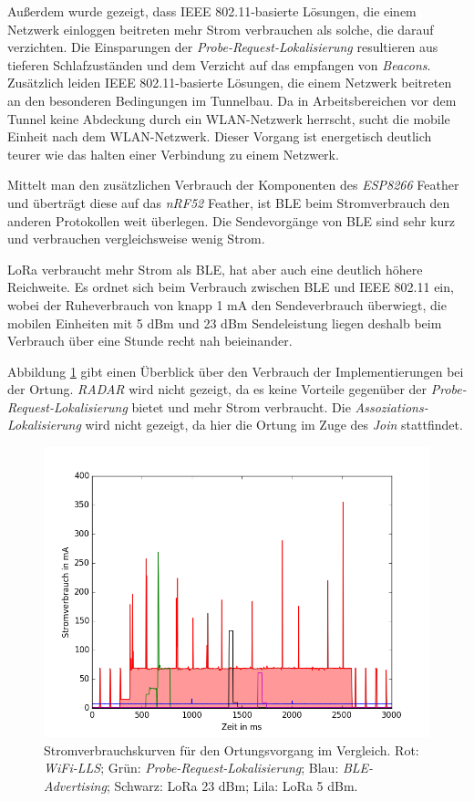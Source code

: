 Außerdem wurde gezeigt, dass IEEE 802.11-basierte Lösungen, die einem Netzwerk einloggen beitreten mehr Strom verbrauchen als solche, die darauf verzichten.
Die Einsparungen der \emph{Probe-Request-Lokalisierung} resultieren aus tieferen Schlafzuständen und dem Verzicht auf das empfangen von \emph{Beacons}.
Zusätzlich leiden IEEE 802.11-basierte Lösungen, die einem Netzwerk beitreten an den besonderen Bedingungen im Tunnelbau.
Da in Arbeitsbereichen vor dem Tunnel keine Abdeckung durch ein WLAN-Netzwerk herrscht, sucht die mobile Einheit nach dem WLAN-Netzwerk.
Dieser Vorgang ist energetisch deutlich teurer wie das halten einer Verbindung zu einem Netzwerk.

Mittelt man den zusätzlichen Verbrauch der Komponenten des \emph{ESP8266} Feather und überträgt diese auf das \emph{nRF52} Feather, ist BLE beim Stromverbrauch den anderen Protokollen weit überlegen.
Die Sendevorgänge von BLE sind sehr kurz und verbrauchen vergleichsweise wenig Strom.

LoRa verbraucht mehr Strom als BLE, hat aber auch eine deutlich höhere Reichweite.
Es ordnet sich beim Verbrauch zwischen BLE und IEEE 802.11 ein, wobei der Ruheverbrauch von knapp 1 mA den Sendeverbrauch überwiegt, die mobilen Einheiten mit 5 dBm und 23 dBm Sendeleistung liegen deshalb beim Verbrauch über eine Stunde recht nah beieinander.

Abbildung \ref{fig:alle} gibt einen Überblick über den Verbrauch der Implementierungen bei der Ortung. 
\emph{RADAR} wird nicht gezeigt, da es keine Vorteile gegenüber der \emph{Probe-Request-Lokalisierung} bietet und mehr Strom verbraucht.
Die \emph{Assoziations-Lokalisierung} wird nicht gezeigt, da hier die Ortung im Zuge des \emph{Join} stattfindet.

\begin{figure}[h!]
  \centering
	\includegraphics[width=\textwidth]{plots/alle.png}
  \caption{Stromverbrauchskurven für den Ortungsvorgang im Vergleich. Rot: \emph{WiFi-LLS}; Grün: \emph{Probe-Request-Lokalisierung}; Blau: \emph{BLE-Advertising}; Schwarz: LoRa 23 dBm; Lila: LoRa 5 dBm.}
  \label{fig:alle}
\end{figure}


